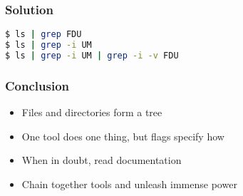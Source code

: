 \begin{frame}[fragile]
\frametitle{Solution}
\begin{lstlisting}[language=bash]
$ ls | grep FDU
$ ls | grep -i UM
$ ls | grep -i UM | grep -i -v FDU
\end{lstlisting}
\end{frame}

\begin{frame}
\frametitle{Conclusion}
\begin{itemize}
    \item Files and directories form a tree
    \item One tool does one thing, but flags specify how
    \item When in doubt, read documentation
    \item Chain together tools and unleash immense power
\end{itemize}
\end{frame}
